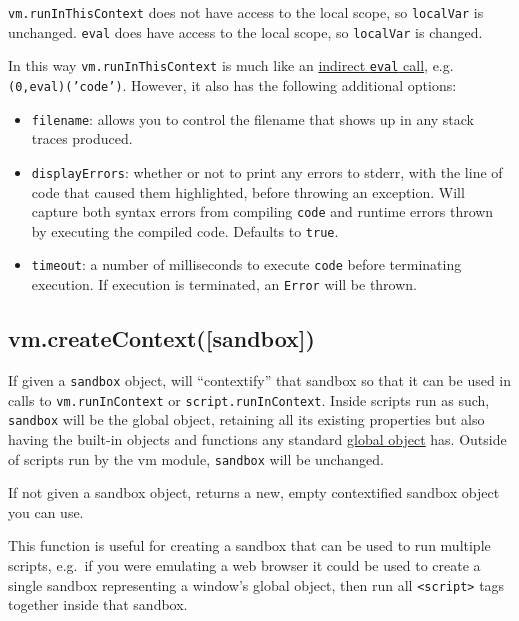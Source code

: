 \texttt{vm.runInThisContext} does not have access to the local scope, so
\texttt{localVar} is unchanged. \texttt{eval} does have access to the
local scope, so \texttt{localVar} is changed.

In this way \texttt{vm.runInThisContext} is much like an
\href{http://es5.github.io/\#x10.4.2}{indirect \texttt{eval} call}, e.g.
\texttt{(0,eval)('code')}. However, it also has the following additional
options:

\begin{itemize}
\itemsep1pt\parskip0pt
\item
  \texttt{filename}: allows you to control the filename that shows up in
  any stack traces produced.
\item
  \texttt{displayErrors}: whether or not to print any errors to stderr,
  with the line of code that caused them highlighted, before throwing an
  exception. Will capture both syntax errors from compiling
  \texttt{code} and runtime errors thrown by executing the compiled
  code. Defaults to \texttt{true}.
\item
  \texttt{timeout}: a number of milliseconds to execute \texttt{code}
  before terminating execution. If execution is terminated, an
  \texttt{Error} will be thrown.
\end{itemize}

\subsection{vm.createContext({[}sandbox{]})}\label{vm.createcontextsandbox}

If given a \texttt{sandbox} object, will ``contextify'' that sandbox so
that it can be used in calls to \texttt{vm.runInContext} or
\texttt{script.runInContext}. Inside scripts run as such,
\texttt{sandbox} will be the global object, retaining all its existing
properties but also having the built-in objects and functions any
standard \href{http://es5.github.io/\#x15.1}{global object} has. Outside
of scripts run by the vm module, \texttt{sandbox} will be unchanged.

If not given a sandbox object, returns a new, empty contextified sandbox
object you can use.

This function is useful for creating a sandbox that can be used to run
multiple scripts, e.g.~if you were emulating a web browser it could be
used to create a single sandbox representing a window's global object,
then run all \texttt{\textless{}script\textgreater{}} tags together
inside that sandbox.

